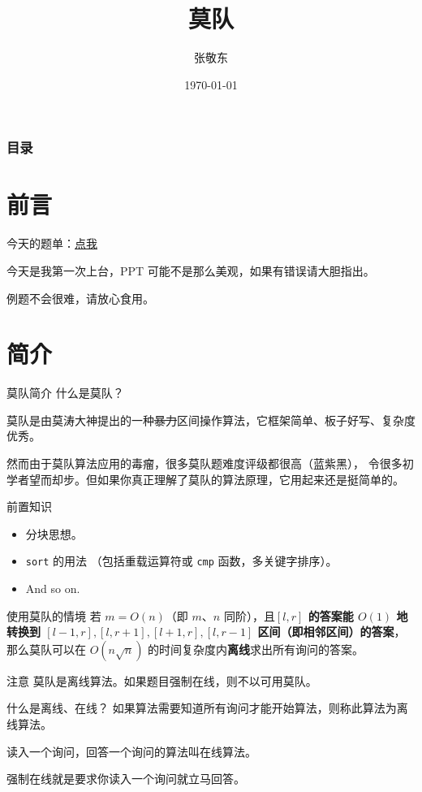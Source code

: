 \documentclass[table]{beamer}
\title{莫队}
\author{张敬东}
\date{\today}
\begin{document}
\frame{\titlepage} %

\begin{frame} %
	\frametitle{目录}
	\tableofcontents
\end{frame}

\section{前言}
\begin{frame}
	今天的题单：{\color{blue}\href{https://www.luogu.com.cn/training/428639}{点我}}

	今天是我第一次上台，PPT 可能不是那么美观，如果有错误请大胆指出。

	例题不会很难，请放心食用。
\end{frame}

\section{简介}

\begin{frame}[fragile]{莫队简介}
	什么是莫队？

	莫队是由莫涛大神提出的一种\sout{暴力}区间操作算法，它框架简单、板子好写、复杂度优秀。

	然而由于莫队算法应用的毒瘤，很多莫队题难度评级都很高（蓝紫黑），
	令很多初学者望而却步。但如果你真正理解了莫队的算法原理，它用起来还是挺简单的。
	\pause

	\begin{block}{前置知识}
		\begin{itemize}
			\item 分块思想。
			\item \verb|sort| 的用法
			（包括重载运算符或 \verb|cmp| 函数，多关键字排序）。
			\item And so on.
		\end{itemize}
	\end{block}
\end{frame}

\begin{frame}{使用莫队的情境}
	若 $m=O(n)$（即 $m$、$n$ 同阶），且\textbf{$[l,r]$ 的答案能 $O(1)$ 地转换到 
	$[l-1,r],[l,r+1],[l+1,r],[l,r-1]$ 区间（即相邻区间）的答案}，
	那么莫队可以在 $O(n\sqrt{n})$ 的时间复杂度内\textbf{离线}求出所有询问的答案。
	\pause

	\begin{alertblock}{注意}
		莫队是离线算法。如果题目强制在线，则不以可用莫队。
	\end{alertblock}

	\begin{block}{什么是离线、在线？}
		如果算法需要知道所有询问才能开始算法，则称此算法为离线算法。

		读入一个询问，回答一个询问的算法叫在线算法。

		强制在线就是要求你读入一个询问就立马回答。
	\end{block}
\end{frame}
\end{document}
